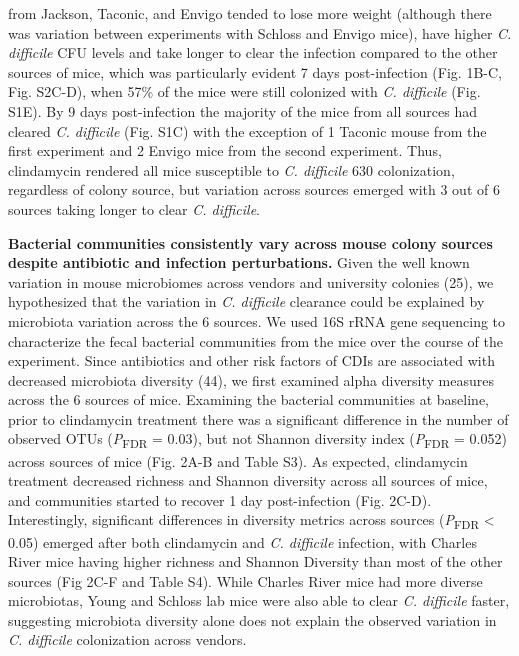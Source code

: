 \documentclass[11pt,]{article}
\begin{document}
from Jackson, Taconic, and Envigo tended to lose more weight (although
there was variation between experiments with Schloss and Envigo mice),
have higher \emph{C. difficile} CFU levels and take longer to clear the
infection compared to the other sources of mice, which was particularly
evident 7 days post-infection (Fig. 1B-C, Fig. S2C-D), when 57\% of the
mice were still colonized with \emph{C. difficile} (Fig. S1E). By 9 days
post-infection the majority of the mice from all sources had cleared
\emph{C. difficile} (Fig. S1C) with the exception of 1 Taconic mouse
from the first experiment and 2 Envigo mice from the second experiment.
Thus, clindamycin rendered all mice susceptible to \emph{C. difficile}
630 colonization, regardless of colony source, but variation across
sources emerged with 3 out of 6 sources taking longer to clear \emph{C.
difficile}.

\textbf{Bacterial communities consistently vary across mouse colony
sources despite antibiotic and infection perturbations.} Given the well
known variation in mouse microbiomes across vendors and university
colonies (25), we hypothesized that the variation in \emph{C. difficile}
clearance could be explained by microbiota variation across the 6
sources. We used 16S rRNA gene sequencing to characterize the fecal
bacterial communities from the mice over the course of the experiment.
Since antibiotics and other risk factors of CDIs are associated with
decreased microbiota diversity (44), we first examined alpha diversity
measures across the 6 sources of mice. Examining the bacterial
communities at baseline, prior to clindamycin treatment there was a
significant difference in the number of observed OTUs
(\emph{P}\textsubscript{FDR} = 0.03), but not Shannon diversity index
(\emph{P}\textsubscript{FDR} = 0.052) across sources of mice (Fig. 2A-B
and Table S3). As expected, clindamycin treatment decreased richness and
Shannon diversity across all sources of mice, and communities started to
recover 1 day post-infection (Fig. 2C-D). Interestingly, significant
differences in diversity metrics across sources
(\emph{P}\textsubscript{FDR} \textless{} 0.05) emerged after both
clindamycin and \emph{C. difficile} infection, with Charles River mice
having higher richness and Shannon Diversity than most of the other
sources (Fig 2C-F and Table S4). While Charles River mice had more
diverse microbiotas, Young and Schloss lab mice were also able to clear
\emph{C. difficile} faster, suggesting microbiota diversity alone does
not explain the observed variation in \emph{C. difficile} colonization
across vendors.
\end{document}
